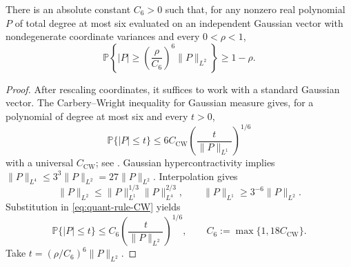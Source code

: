 \begin{lemma}
\label{lem:quant-rule-AC}
There is an absolute constant $C_6>0$ such that, for any nonzero real
polynomial $P$ of total degree at most six evaluated on an independent
Gaussian vector with nondegenerate coordinate variances and every
$0<\rho<1$,
\begin{equation}
 \mathbb P\!\left\{
   |P|\ge\left(\frac{\rho}{C_6}\right)^6\|P\|_{L^2}
 \right\}\ge 1-\rho.
 \label{eq:quant-rule-AC}
\end{equation}
\end{lemma}
\begin{proof}
After rescaling coordinates, it suffices to work with a standard Gaussian
vector.  The Carbery--Wright inequality for Gaussian measure gives, for a
polynomial of degree at most six and every $t>0$,
\begin{equation}
 \mathbb P\{|P|\le t\}
 \le 6C_{\mathrm{CW}}
       \left(\frac{t}{\|P\|_{L^1}}\right)^{1/6}
 \label{eq:quant-rule-CW}
\end{equation}
with a universal $C_{\mathrm{CW}}$; see
\cite{carbery2001distributional}.
Gaussian hypercontractivity
\cite{janson1997gaussian} implies
$\|P\|_{L^4}\le 3^3\|P\|_{L^2}=27\|P\|_{L^2}$.
Interpolation gives
\begin{equation}
 \|P\|_{L^2}\le
 \|P\|_{L^1}^{1/3}\|P\|_{L^4}^{2/3},
 \qquad
 \|P\|_{L^1}\ge 3^{-6}\|P\|_{L^2}.
\end{equation}
Substitution in \eqref{eq:quant-rule-CW} yields
\begin{equation}
 \mathbb P\{|P|\le t\}
 \le C_6\left(\frac{t}{\|P\|_{L^2}}\right)^{1/6},
 \qquad C_6:=\max\{1,18C_{\mathrm{CW}}\}.
\end{equation}
Take $t=(\rho/C_6)^6\|P\|_{L^2}$.
\end{proof}

